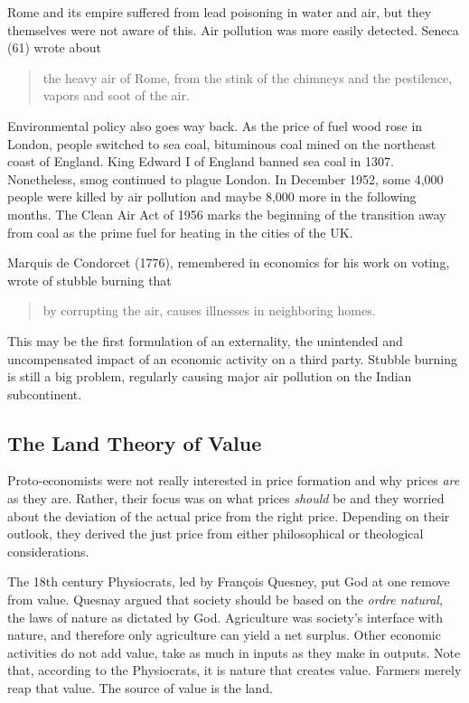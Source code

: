 Rome and its empire suffered from lead poisoning in water and air, but they themselves were not aware of this. Air pollution was more easily detected. Seneca (61) wrote about
\begin{quote}
    the heavy air of Rome, from the stink of the chimneys and the pestilence, vapors and soot of the air.
\end{quote} 

Environmental policy also goes way back. As the price of fuel wood rose in London, people switched to sea coal, bituminous coal mined on the northeast coast of England. King Edward I of England banned sea coal in 1307. Nonetheless, smog continued to plague London. In December 1952, some 4,000 people were killed by air pollution and maybe 8,000 more in the following months. The Clean Air Act of 1956 marks the beginning of the transition away from coal as the prime fuel for heating in the cities of the UK.

Marquis de Condorcet (1776), remembered in economics for his work on voting, wrote of stubble burning that
\begin{quote}
    by corrupting the air, causes illnesses in neighboring homes.
\end{quote}
This may be the first formulation of an externality, the unintended and uncompensated impact of an economic activity on a third party. Stubble burning is still a big problem, regularly causing major air pollution on the Indian subcontinent.

\subsection{The Land Theory of Value}
Proto-economists were not really interested in price formation and why prices \emph{are} as they are. Rather, their focus was on what prices \emph{should} be and they worried about the deviation of the actual price from the right price. Depending on their outlook, they derived the just price from either philosophical or theological considerations.

The 18th century Physiocrats, led by Fran\c{c}ois Quesney, put God at one remove from value. Quesnay argued that society should be based on the \emph{ordre natural}, the laws of nature as dictated by God. Agriculture was society's interface with nature, and therefore only agriculture can yield a net surplus. Other economic activities do not add value, take as much in inputs as they make in outputs. Note that, according to the Physiocrats, it is nature that creates value. Farmers merely reap that value. The source of value is the land.

